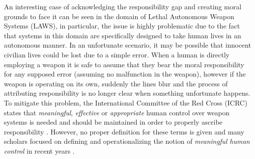 An interesting case of acknowledging the responsibility gap and creating moral grounds to face it can be seen in the domain of Lethal Autonomous Weapon Systems (LAWS), in particular, the issue is highly problematic due to the fact that systems in this domain are specifically designed to take human lives in an autonomous manner.
In an unfortunate scenario, it may be possible that innocent civilian lives could be lost due to a simple error.
When a human is directly employing a weapon it is safe to assume that they bear the moral responsibility for any supposed error (assuming no malfunction in the weapon), however if the weapon is operating on its own, suddenly the lines blur and the process of attributing responsibility is no longer clear when something unfortunate happens.
To mitigate this problem, the International Committee of the Red Cross (ICRC) states that \textit{meaningful}, \textit{effective} or \textit{appropriate} human control over weapon systems is needed and should be maintained in order to properly ascribe responsibility \parencite{ICRCEA}.
However, no proper definition for these terms is given and many scholars focused on defining and operationalizing the notion of \textit{meaningful human control} in recent years \parencite{VERAAC, EKEMBS}.